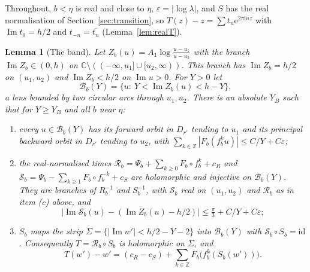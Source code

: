 \documentclass[11pt]{amsart}
\newtheorem{lemma}[theorem]{Lemma}
\theoremstyle{definition}
\newcommand{\Rr}{R}
\newcommand{\eee}{\mathrm{e}}
\newcommand{\ii}{\mathrm{i}}
\begin{document}
Throughout, $b<\eta$ is real and close to $\eta$, $\varepsilon=|\log\lambda|$,
and $S$ has the real normalisation of Section~\ref{sec:transition}, so
$T(z)-z=\sum t_n\eee^{2\pi\ii nz}$ with $\operatorname{Im}t_0=h/2$ and
$t_{-n}=\overline{t_n}$ (Lemma~\ref{lem:realT}).

\begin{lemma}[The band]\label{lem:band}
Let $Z_b(u)=A_1\log\frac{u-u_1}{u-u_2}$ with the branch
$\operatorname{Im}Z_b\in(0,h)$ on $\mathbb C\setminus((-\infty,u_1]\cup[u_2,\infty))$.
This branch has $\operatorname{Im}Z_b=h/2$ on $(u_1,u_2)$ and
$\operatorname{Im}Z_b<h/2$ on $\operatorname{Im}u>0$.  For $Y>0$ let
\[
 \mathcal B_b(Y)=\{u:\ Y<\operatorname{Im}Z_b(u)<h-Y\},
\]
a lens bounded by two circular arcs through $u_1,u_2$.  There is an absolute
$Y_B$ such that for $Y\ge Y_B$ and all $b$ near $\eta$:
\begin{enumerate}
\item[(i)] every $u\in\mathcal B_b(Y)$ has its forward orbit in $D_{r'}$ tending
  to $u_1$ and its principal backward orbit in $D_{r'}$ tending to $u_2$, with
  $\sum_{k\in\mathbb Z}|F_b(f_b^ku)|\le C/Y+C\varepsilon$;
\item[(ii)] the real-normalised times $\mathcal R_b=\Psi_b+\sum_{k\ge0}F_b\circ f_b^k+c_R$
  and $\mathcal S_b=\Psi_b-\sum_{k\ge1}F_b\circ f_b^{-k}+c_S$ are holomorphic and
  injective on $\mathcal B_b(Y)$.  They are branches of $\Rr_b^{-1}$ and
  $S_b^{-1}$, with $\mathcal S_b$ real on $(u_1,u_2)$ and $\mathcal R_b$ as in
  item (c) above, and
  \[
   \bigl|\operatorname{Im}\mathcal S_b(u)-(\operatorname{Im}Z_b(u)-h/2)\bigr|
   \le\tfrac\pi3+C/Y+C\varepsilon ;
  \]
\item[(iii)] $S_b$ maps the strip $\Sigma=\{|\operatorname{Im}w'|<h/2-Y-2\}$
  into $\mathcal B_b(Y)$ with $\mathcal S_b\circ S_b=\mathrm{id}$.  Consequently
  $T=\mathcal R_b\circ S_b$ is holomorphic on $\Sigma$, and
  \[
   T(w')-w'=(c_R-c_S)+\sum_{k\in\mathbb Z}F_b\bigl(f_b^k(S_b(w'))\bigr).
  \]
\end{enumerate}
\end{lemma}
\end{document}
